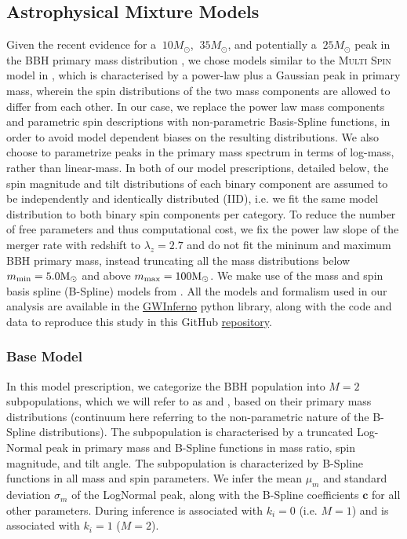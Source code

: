 \subsection{Astrophysical Mixture Models} \label{sec:astromodels} 

Given the recent evidence for a $~10 M_{\odot}$, $~35 M_{\odot}$, and potentially a $~25 M_{\odot}$ peak in the BBH primary mass distribution \citep{2111.03634, 2022ApJ...928..155T, 10.3847/2041-8213/aa9bf6, 10.3847/1538-4357/aab34c, 10.3847/2041-8213/ab3800, 2021ApJ...913L...7A,2022arXiv221012834E}, we chose models similar to the \textsc{Multi Spin} model in \cite{2021ApJ...913L...7A}, which is characterised by a power-law plus a Gaussian peak in primary mass, wherein the spin distributions of the two mass components are allowed to differ from each other. In our case, we replace the power law mass components and parametric spin descriptions with non-parametric Basis-Spline functions, in order to avoid model dependent biases on the resulting distributions.
We also choose to parametrize peaks in the primary mass spectrum in terms of log-mass, rather than linear-mass. 
In both of our model prescriptions, detailed below, the spin magnitude and tilt distributions of each binary component are assumed to be independently and identically distributed (IID), i.e. we fit the same model distribution to both binary spin components per category. To reduce the number of free parameters and thus computational cost, we fix the power law slope of the merger rate with redshift to $\lambda_z=2.7$ and do not fit the mininum and maximum BBH primary mass, instead truncating all the mass distributions below $m_\text{min} = 5.0{\rm M}_\odot$ and above $m_\text{max} = 100{\rm M}_\odot$. We make use of the mass and spin basis spline (B-Spline) models from \cite{2022arXiv221012834E}. All the models and formalism used in our analysis are available in the \href{https://git.ligo.org/bruce.edelman/gwinferno}{GWInferno} python library, along with the code and data to reproduce this study in this GitHub \href{https://github.com/jaxeng/paper}{repository}. 



\subsubsection{Base Model}
In this model prescription, we categorize the BBH population into $M=2$ subpopulations, which we will refer to as \first{} and \contB{}, based on their primary mass distributions (continuum here referring to the non-parametric nature of the B-Spline distributions). The \first{} subpopulation is characterised by a truncated Log-Normal peak in primary mass and B-Spline functions in mass ratio, spin magnitude, and tilt angle. The \contB{} subpopulation is characterized by B-Spline functions in all mass and spin parameters. We infer the mean $\mu_m$ and standard deviation $\sigma_m$ of the LogNormal peak, along with the B-Spline coefficients $\mathbf{c}$ for all other parameters. During inference \first{} is associated with $k_i = 0$ (i.e. $M=1$) and \contB{} is associated with $k_i = 1$ ($M=2$).

